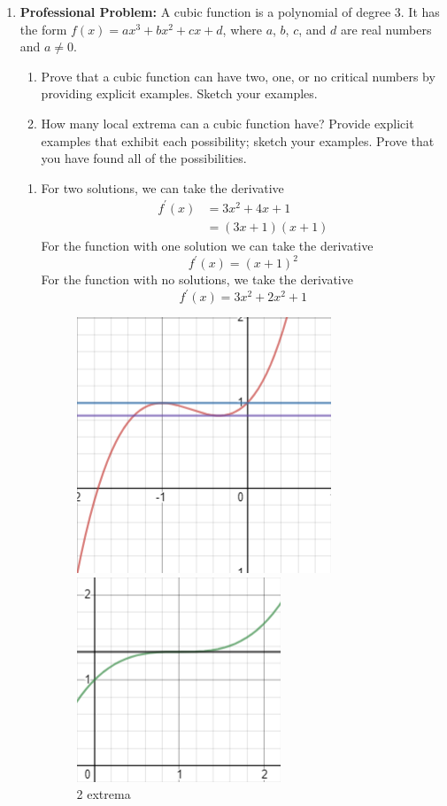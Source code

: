 \documentclass{article}
\begin{document}
\begin{enumerate}[label=\textbf{(13.\arabic*)}]
\item \textbf{Professional Problem:} A cubic function is a polynomial of degree 3. It has the form $f(x)=ax^3+bx^2+cx+d$, where $a$, $b$, $c$, and $d$ are real numbers and $a\neq0$.
\begin{enumerate}[label=(\alph*)]
\item Prove that a cubic function can have two, one, or no critical numbers by providing explicit examples. Sketch your examples.
\item How many local extrema can a cubic function have? Provide explicit examples that exhibit each possibility; sketch your examples. Prove that you have found all of the possibilities.
\end{enumerate}
\begin{enumerate}[label=(\alph*)]
\item For two solutions, we can take the derivative
\begin{align*}
f^\prime(x)&=3x^2+4x+1 \\
&=(3x+1)(x+1)
\end{align*}
 For the function with one solution we can take the derivative
\[f^\prime(x)=(x+1)^2\]
For the function with no solutions, we take the derivative
\[f^\prime(x)=3x^2+2x^2+1\]
\begin{figure}[H]
\centering
\begin{minipage}{.3\textwidth}
  \centering
  \includegraphics[width=.4\linewidth]{graph5}
  \caption{2 extrema}
  \label{fig:test1}
\end{minipage}%
\begin{minipage}{.3\textwidth}
  \centering
  \includegraphics[width=.4\linewidth]{graph6}

\end{minipage}
\end{figure}
\end{enumerate}
\end{enumerate}
\end{document}
